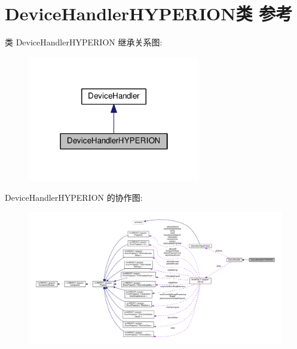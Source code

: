 \hypertarget{class_device_handler_h_y_p_e_r_i_o_n}{\section{Device\+Handler\+H\+Y\+P\+E\+R\+I\+O\+N类 参考}
\label{class_device_handler_h_y_p_e_r_i_o_n}
}


类 Device\+Handler\+H\+Y\+P\+E\+R\+I\+O\+N 继承关系图\+:
\nopagebreak
\begin{figure}[H]
\begin{center}
\leavevmode
\includegraphics[width=214pt]{class_device_handler_h_y_p_e_r_i_o_n__inherit__graph}
\end{center}
\end{figure}


Device\+Handler\+H\+Y\+P\+E\+R\+I\+O\+N 的协作图\+:
\nopagebreak
\begin{figure}[H]
\begin{center}
\leavevmode
\includegraphics[width=350pt]{class_device_handler_h_y_p_e_r_i_o_n__coll__graph}
\end{center}
\end{figure}
